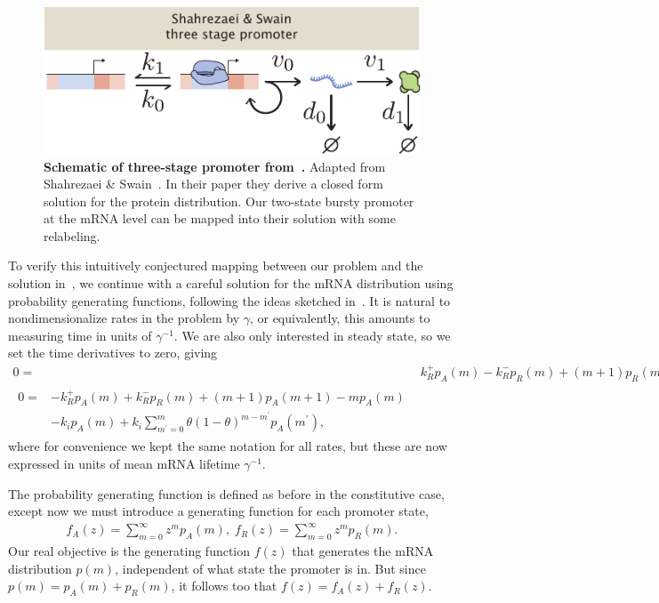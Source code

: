 \begin{figure}
\centering
\includegraphics{../../figures/si/figS0X_Shahrezaei_promoter.pdf}
\caption{\textbf{Schematic of three-stage promoter from~\cite{Shahrezaei2008}.}
Adapted from Shahrezaei \& Swain~\cite{Shahrezaei2008}. In their paper they
derive a closed form solution for the protein distribution. Our two-state bursty
promoter at the mRNA level can be mapped into their solution with some
relabeling.}
\label{fig:shahrezaei}
\end{figure}

To verify this intuitively conjectured mapping between our problem and the
solution in~\cite{Shahrezaei2008}, we continue with a careful solution for the
mRNA distribution using probability generating functions, following the ideas
sketched in~\cite{Shahrezaei2008}. It is natural to nondimensionalize rates in
the problem by $\gamma$, or equivalently, this amounts to measuring time in
units of $\gamma^{-1}$. We are also only interested in steady state, so we set
the time derivatives to zero, giving
\begin{align}
0 =& k_R^+ p_A(m) - k_R^- p_R(m) + (m+1) p_R(m+1) - m p_R(m)
\\
\begin{split}
0 =& - k_R^+ p_A(m) + k_R^- p_R(m) + (m+1) p_A(m+1) - m p_A(m) 
\\
&- k_i p_A(m) + k_i \sum_{m^\prime=0}^m \theta(1-\theta)^{m-m^\prime} p_A(m^\prime),
\end{split}
\end{align}
where for convenience we kept the same notation for all rates, but these are
now expressed in units of mean mRNA lifetime $\gamma^{-1}$.
        
The probability generating function is defined as before in the constitutive
case, except now we must introduce a generating function for each promoter
state,
\begin{align}
f_A(z) = \sum_{m=0}^\infty z^m p_A(m),
\;
f_R(z) = \sum_{m=0}^\infty z^m p_R(m).
\end{align}
Our real objective is the generating function $f(z)$ that generates the mRNA
distribution $p(m)$, independent of what state the promoter is in. But since
$p(m) = p_A(m) + p_R(m)$, it follows too that $f(z) = f_A(z) + f_R(z)$.

